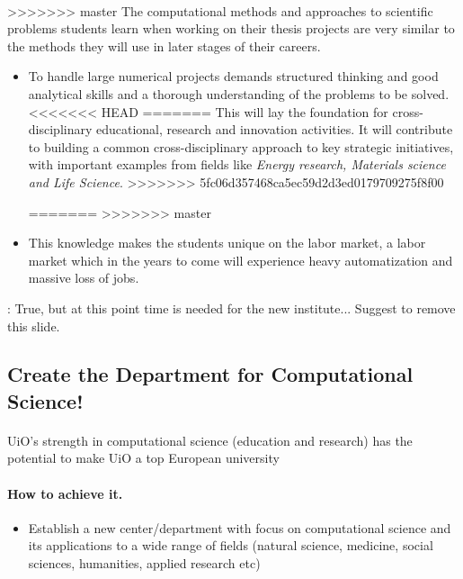 \documentclass[%
<<<<<<< HEAD
<<<<<<< HEAD
oneside,                 %
final,                   %
=======
twoside,                 %
final,                   %
>>>>>>> 5fc06d357468ca5ec59d2d3ed0179709275f8f00
=======
oneside,                 %
final,                   %
>>>>>>> master
10pt]{article}
\newcommand{\shortinlinecomment}[3]{{\color{red}{\bf #1}: #2}}
\begin{document}
\begin{itemize}
\paragraph{}
>>>>>>> master
The computational methods and approaches to scientific problems students learn
when working on their thesis projects are very similar to the methods
they will use in later stages of their careers.
\begin{itemize}
\item To handle large numerical projects demands structured thinking and good analytical skills and a thorough understanding of the problems to be solved.
<<<<<<< HEAD
=======
This will lay the foundation for cross-disciplinary
educational, research and innovation activities. It will contribute to building a common cross-disciplinary
approach to key strategic initiatives, with important examples from fields like  \emph{Energy research, Materials science and  Life Science}.
>>>>>>> 5fc06d357468ca5ec59d2d3ed0179709275f8f00




=======
>>>>>>> master

\item This knowledge makes the students unique on the labor market, a labor market which in the years to come will experience heavy automatization and massive loss of jobs.
\end{itemize}

\noindent



\shortinlinecomment{hpl 3}{ True, but at this point time is needed for the new institute... Suggest to remove this slide. }{ True, but at this }

\subsection*{Create the Department for Computational Science!}


\paragraph{}
UiO's strength in computational science (education and research)
has the potential to make UiO a top European university




\paragraph{How to achieve it.}
\begin{itemize}
\item Establish  a new center/department with focus on computational science and its applications to a wide range of fields (natural science, medicine, social sciences, humanities, applied research etc)


\end{itemize}
\end{itemize}
\end{document}
